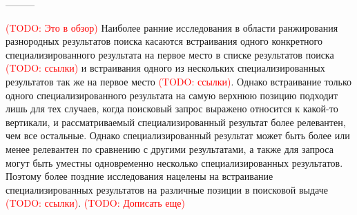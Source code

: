 \documentclass[12pt,a4paper]{report}
\newcommand\note[1]{\textcolor{red}{(#1)}}
\newcommand\todonote[1]{\note{TODO: #1}}
\begin{document}








---------

\todonote{Это в обзор}
Наиболее ранние исследования в области ранжирования разнородных результатов поиска касаются встраивания одного конкретного специализированного результата на первое место в списке результатов поиска \todonote{ссылки} и встраивания одного из нескольких специализированных результатов так же на первое место \todonote{ссылки}. Однако встраивание только одного специализированного результата на самую верхнюю позицию подходит лишь для тех случаев, когда поисковый запрос выражено относится к какой-то вертикали, и рассматриваемый специализированный результат более релевантен, чем все остальные. Однако специализированный результат может быть более или менее релевантен по сравнению с другими результатами, а также для запроса могут быть уместны одновременно несколько специализированных результатов. Поэтому более поздние исследования нацелены на встраивание специализированных результатов на различные позиции в поисковой выдаче \todonote{ссылки}. \todonote{Дописать еще}
\end{document}
